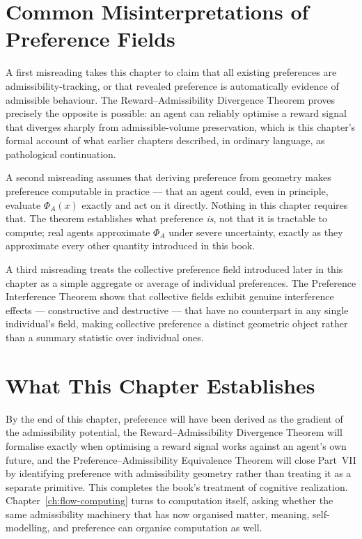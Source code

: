\documentclass[12pt,twoside,openright]{book}
\begin{document}
\section{Common Misinterpretations of Preference Fields}
\label{sec:ch22-misinterpretations}

A first misreading takes this chapter to claim that all
existing preferences are admissibility-tracking, or that
revealed preference is automatically evidence of admissible
behaviour. The Reward--Admissibility Divergence Theorem
proves precisely the opposite is possible: an agent can
reliably optimise a reward signal that diverges sharply from
admissible-volume preservation, which is this chapter's
formal account of what earlier chapters described, in
ordinary language, as pathological continuation.

A second misreading assumes that deriving preference from
geometry makes preference computable in practice --- that an
agent could, even in principle, evaluate $\Phi_A(x)$ exactly
and act on it directly. Nothing in this chapter requires
that. The theorem establishes what preference \emph{is},
not that it is tractable to compute; real agents approximate
$\Phi_A$ under severe uncertainty, exactly as they
approximate every other quantity introduced in this book.

A third misreading treats the collective preference field
introduced later in this chapter as a simple aggregate or
average of individual preferences. The Preference
Interference Theorem shows that collective fields exhibit
genuine interference effects --- constructive and
destructive --- that have no counterpart in any single
individual's field, making collective preference a distinct
geometric object rather than a summary statistic over
individual ones.

\section{What This Chapter Establishes}
\label{sec:ch22-preview}

By the end of this chapter, preference will have been derived
as the gradient of the admissibility potential, the
Reward--Admissibility Divergence Theorem will formalise
exactly when optimising a reward signal works against an
agent's own future, and the Preference--Admissibility
Equivalence Theorem will close Part~VII by identifying
preference with admissibility geometry rather than treating
it as a separate primitive. This completes the book's
treatment of cognitive realization. Chapter~\ref{ch:flow-computing}
turns to computation itself, asking whether the same
admissibility machinery that has now organised matter,
meaning, self-modelling, and preference can organise
computation as well.
\end{document}
